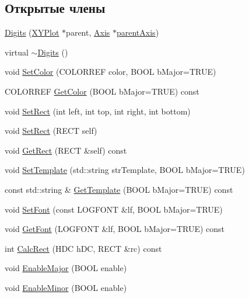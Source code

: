 \subsection*{Открытые члены}
\begin{DoxyCompactItemize}
\item 
\hyperlink{class_digits_acd329f27f77896fa7ce6c5e494beaa1c}{Digits} (\hyperlink{class_x_y_plot}{X\-Y\-Plot} $\ast$parent, \hyperlink{class_axis}{Axis} $\ast$\hyperlink{class_digits_a40f4adf8eaf3b89b66adbbccc2099d5d}{parent\-Axis})
\item 
virtual \hyperlink{class_digits_a66e19468f256da28a103894f2ceb9cfe}{$\sim$\-Digits} ()
\item 
void \hyperlink{class_digits_a7d4c1c32b27083457ef094bc7a27ec13}{Set\-Color} (C\-O\-L\-O\-R\-R\-E\-F color, B\-O\-O\-L b\-Major=T\-R\-U\-E)
\item 
C\-O\-L\-O\-R\-R\-E\-F \hyperlink{class_digits_a29d3f2ec295eeebb390bc1eb93b612af}{Get\-Color} (B\-O\-O\-L b\-Major=T\-R\-U\-E) const 
\item 
void \hyperlink{class_digits_ae6c4780ba7c4aba52efff6c8ab353f57}{Set\-Rect} (int left, int top, int right, int bottom)
\item 
void \hyperlink{class_digits_a3c4e4199c39cd5b61f7e9bc23dfb979a}{Set\-Rect} (R\-E\-C\-T self)
\item 
void \hyperlink{class_digits_a6b4c60c397a2c8355dd0a0f31eed1929}{Get\-Rect} (R\-E\-C\-T \&self) const 
\item 
void \hyperlink{class_digits_af74a68f96749f6caf6496b31dacb30e0}{Set\-Template} (std\-::string str\-Template, B\-O\-O\-L b\-Major=T\-R\-U\-E)
\item 
const std\-::string \& \hyperlink{class_digits_aa3072c531d0f83c34cf9e97a5504a43f}{Get\-Template} (B\-O\-O\-L b\-Major=T\-R\-U\-E) const 
\item 
void \hyperlink{class_digits_a06c7cf0b99ff10f9e5d623d62c98426d}{Set\-Font} (const L\-O\-G\-F\-O\-N\-T \&lf, B\-O\-O\-L b\-Major=T\-R\-U\-E)
\item 
void \hyperlink{class_digits_a8cdd43accc18a651207de6c1c8f438c4}{Get\-Font} (L\-O\-G\-F\-O\-N\-T \&lf, B\-O\-O\-L b\-Major=T\-R\-U\-E) const 
\item 
int \hyperlink{class_digits_a7641a9787d3b78bac0425e5597a3e5de}{Calc\-Rect} (H\-D\-C h\-D\-C, R\-E\-C\-T \&rc) const 
\item 
void \hyperlink{class_digits_a9b973868449945e26a10fe3953566d9d}{Enable\-Major} (B\-O\-O\-L enable)
\item 
void \hyperlink{class_digits_a7c34d2810ef21b76b6a301f482b09df3}{Enable\-Minor} (B\-O\-O\-L enable)

\end{DoxyCompactItemize}
